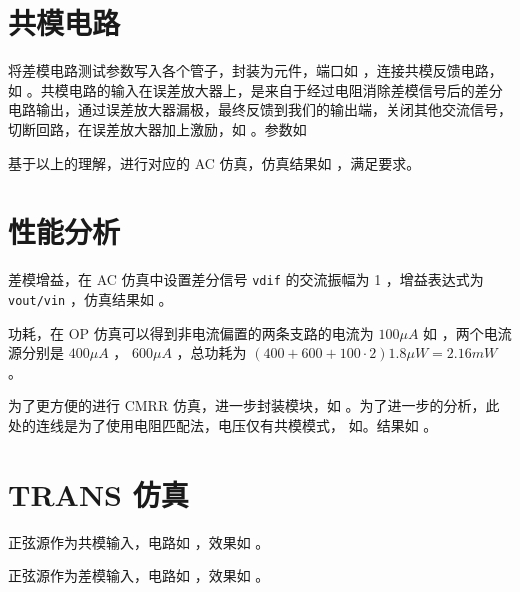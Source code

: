 \documentclass[lang=cn,11pt,a4paper,cite=authoryear]{elegantpaper}
\begin{document}

\section{共模电路}

将差模电路测试参数写入各个管子，封装为元件，端口如  ，连接共模反馈电路，如  。共模电路的输入在误差放大器上，是来自于经过电阻消除差模信号后的差分电路输出，通过误差放大器漏极，最终反馈到我们的输出端，关闭其他交流信号，切断回路，在误差放大器加上激励，如 。参数如 




基于以上的理解，进行对应的 AC 仿真，仿真结果如  ，满足要求。


\section{性能分析}

差模增益，在 AC 仿真中设置差分信号 \lstinline{vdif} 的交流振幅为 1 ，增益表达式为 \lstinline{vout/vin} ，仿真结果如  。


功耗，在 OP 仿真可以得到非电流偏置的两条支路的电流为 \(100 \mu A\) 如 ，两个电流源分别是 \(400\mu A\) ， \(600 \mu A\) ，总功耗为 \((400 + 600 + 100 \cdot 2) 1.8 \mu W = 2.16 mW\) 。


为了更方便的进行 CMRR 仿真，进一步封装模块，如  。为了进一步的分析，此处的连线是为了使用电阻匹配法，电压仅有共模模式， 如。结果如  。




\section{TRANS 仿真}

正弦源作为共模输入，电路如  ，效果如  。



正弦源作为差模输入，电路如  ，效果如  。




\end{document}
